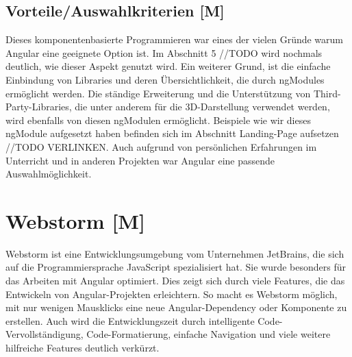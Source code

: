 \subsection{Vorteile/Auswahlkriterien [M]}
Dieses komponentenbasierte Programmieren war eines der vielen Gründe 
warum Angular eine geeignete Option ist. Im Abschnitt 5 //TODO  wird nochmals deutlich, wie dieser Aspekt genutzt wird. Ein weiterer Grund, ist die einfache Einbindung von 
Libraries und deren Übersichtlichkeit, die durch ngModules ermöglicht werden. Die ständige Erweiterung und die Unterstützung von Third-Party-Libraries, die unter anderem für die 3D-Darstellung verwendet werden, wird ebenfalls von diesen ngModulen ermöglicht. Beispiele wie wir dieses ngModule aufgesetzt haben befinden sich im Abschnitt Landing-Page aufsetzen //TODO VERLINKEN. Auch aufgrund von persönlichen Erfahrungen im Unterricht und in anderen Projekten war Angular eine passende Auswahlmöglichkeit. 
\cite{AngularNgModules}



\section{Webstorm [M]}
Webstorm ist eine Entwicklungsumgebung vom Unternehmen JetBrains, die sich auf die Programmiersprache JavaScript spezialisiert hat. Sie wurde besonders für das Arbeiten mit Angular optimiert. Dies zeigt sich durch viele Features, die das Entwickeln von Angular-Projekten erleichtern. So macht es Webstorm möglich, mit nur wenigen Mausklicks eine neue Angular-Dependency oder Komponente zu erstellen. Auch wird die Entwicklungszeit durch intelligente Code-Vervollständigung, Code-Formatierung, einfache Navigation und viele weitere hilfreiche Features deutlich verkürzt.
\cite{Webstorm}

